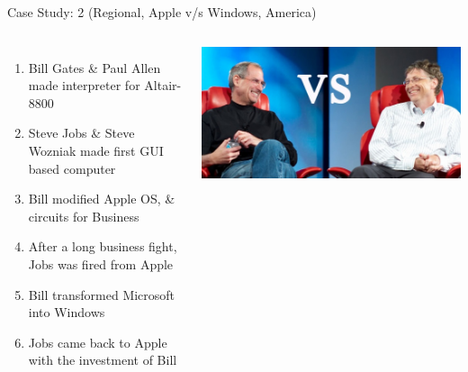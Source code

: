 \begin{frame}{Case Study: 2 (Regional, Apple v/s Windows, America)}
\begin{columns}
\begin{enumerate}
	\item Bill Gates \& Paul Allen made interpreter for Altair-8800
	\item Steve Jobs \& Steve Wozniak made first GUI based computer
	\item Bill modified Apple OS, \& circuits for Business
	\item After a long business fight, Jobs was fired from Apple
	\item Bill transformed Microsoft into Windows
	\item Jobs came back to Apple with the investment of Bill
\end{enumerate}
\includegraphics[width=\textwidth]{img/steveNbill.jpg}
\end{columns}
\end{frame}
